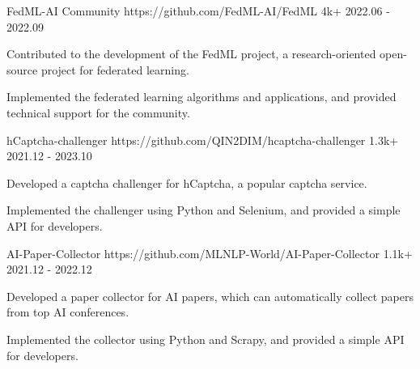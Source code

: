 
\begin{cventries}

\cvproject
{FedML-AI Community} %
{https://github.com/FedML-AI/FedML} %
{4k+} %
{2022.06 - 2022.09} %
{
\begin{cvitems} %
\item {Contributed to the development of the FedML project, a research-oriented open-source project for federated learning.}
\item {Implemented the federated learning algorithms and applications, and provided technical support for the community.}
\end{cvitems}
} %



\cvproject
{hCaptcha-challenger} %
{https://github.com/QIN2DIM/hcaptcha-challenger} %
{1.3k+} %
{2021.12 - 2023.10} %
{
\begin{cvitems} %
\item {Developed a captcha challenger for hCaptcha, a popular captcha service.}
\item {Implemented the challenger using Python and Selenium, and provided a simple API for developers.}
\end{cvitems}
} %



\cvproject
{AI-Paper-Collector} %
{https://github.com/MLNLP-World/AI-Paper-Collector}
{1.1k+} %
{2021.12 - 2022.12} %
{
\begin{cvitems} %
\item {Developed a paper collector for AI papers, which can automatically collect papers from top AI conferences.}
\item {Implemented the collector using Python and Scrapy, and provided a simple API for developers.}
\end{cvitems}
} %


\end{cventries}
